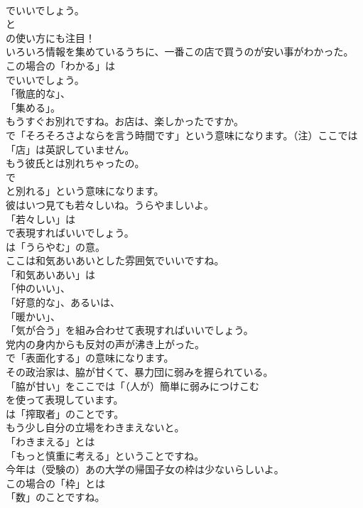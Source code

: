 \documentclass[8pt]{extreport}
\begin{document}
\begin{CJK}{UTF8}{min}
\\	でいいでしょう。
\\	と
\\	の使い方にも注目！	
\\	いろいろ情報を集めているうちに、一番この店で買うのが安い事がわかった。 
\\	この場合の「わかる」は
\\	でいいでしょう。
\\	「徹底的な」、
\\	「集める」。	
\\	もうすぐお別れですね。お店は、楽しかったですか。 
\\	で「そろそろさよならを言う時間です」という意味になります。（注）ここでは「店」は英訳していません。	
\\	もう彼氏とは別れちゃったの。 
\\	で
\\	と別れる」という意味になります。	
\\	彼はいつ見ても若々しいね。うらやましいよ。 
\\	「若々しい」は 
\\	で表現すればいいでしょう。
\\	は「うらやむ」の意。	
\\	ここは和気あいあいとした雰囲気でいいですね。 
\\	「和気あいあい」は
\\	「仲のいい」、
\\	「好意的な」、あるいは、
\\	「暖かい」、
\\	「気が合う」を組み合わせて表現すればいいでしょう。	
\\	党内の身内からも反対の声が沸き上がった。 
\\	で「表面化する」の意味になります。	
\\	その政治家は、脇が甘くて、暴力団に弱みを握られている。 
\\	「脇が甘い」をここでは「（人が）簡単に弱みにつけこむ
\\	を使って表現しています。
\\	は「搾取者」のことです。	
\\	もう少し自分の立場をわきまえないと。 
\\	「わきまえる」とは
\\	「もっと慎重に考える」ということですね。	
\\	今年は（受験の）あの大学の帰国子女の枠は少ないらしいよ。 
\\	この場合の「枠」とは
\\	「数」のことですね。

\end{CJK}
\end{document}

